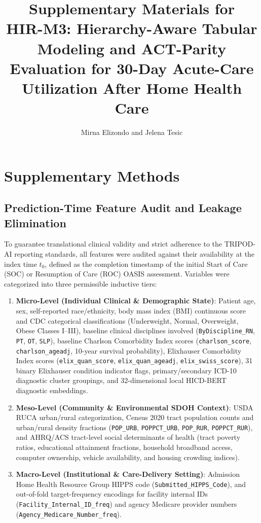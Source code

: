 \documentclass[10pt,journal]{IEEEtran}
\begin{document}
\title{Supplementary Materials for\\
HIR-M3: Hierarchy-Aware Tabular Modeling and ACT-Parity Evaluation for
30-Day Acute-Care Utilization After Home Health Care}

\author{Mirna Elizondo and Jelena Tesic}

\maketitle

\section{Supplementary Methods}

\subsection{Prediction-Time Feature Audit and Leakage Elimination}
To guarantee translational clinical validity and strict adherence to the TRIPOD-AI reporting standards, all features were audited against their availability at the index time $t_0$, defined as the completion timestamp of the initial Start of Care (SOC) or Resumption of Care (ROC) OASIS assessment. Variables were categorized into three permissible inductive tiers:
\begin{enumerate}
    \item \textbf{Micro-Level (Individual Clinical \& Demographic State)}: Patient age, sex, self-reported race/ethnicity, body mass index (BMI) continuous score and CDC categorical classifications (Underweight, Normal, Overweight, Obese Classes I--III), baseline clinical disciplines involved (\texttt{ByDiscipline\_RN}, \texttt{PT}, \texttt{OT}, \texttt{SLP}), baseline Charlson Comorbidity Index scores (\texttt{charlson\_score}, \texttt{charlson\_ageadj}, 10-year survival probability), Elixhauser Comorbidity Index scores (\texttt{elix\_quan\_score}, \texttt{elix\_quan\_ageadj}, \texttt{elix\_swiss\_score}), 31 binary Elixhauser condition indicator flags, primary/secondary ICD-10 diagnostic cluster groupings, and 32-dimensional local HICD-BERT diagnostic embeddings.
    \item \textbf{Meso-Level (Community \& Environmental SDOH Context)}: USDA RUCA urban/rural categorization, Census 2020 tract population counts and urban/rural density fractions (\texttt{POP\_URB}, \texttt{POPPCT\_URB}, \texttt{POP\_RUR}, \texttt{POPPCT\_RUR}), and AHRQ/ACS tract-level social determinants of health (tract poverty ratios, educational attainment fractions, household broadband access, computer ownership, vehicle availability, and housing crowding indices).
    \item \textbf{Macro-Level (Institutional \& Care-Delivery Setting)}: Admission Home Health Resource Group HIPPS code (\texttt{Submitted\_HIPPS\_Code}), and out-of-fold target-frequency encodings for facility internal IDs (\texttt{Facility\_Internal\_ID\_freq}) and agency Medicare provider numbers (\texttt{Agency\_Medicare\_Number\_freq}).
\end{enumerate}
\end{document}
